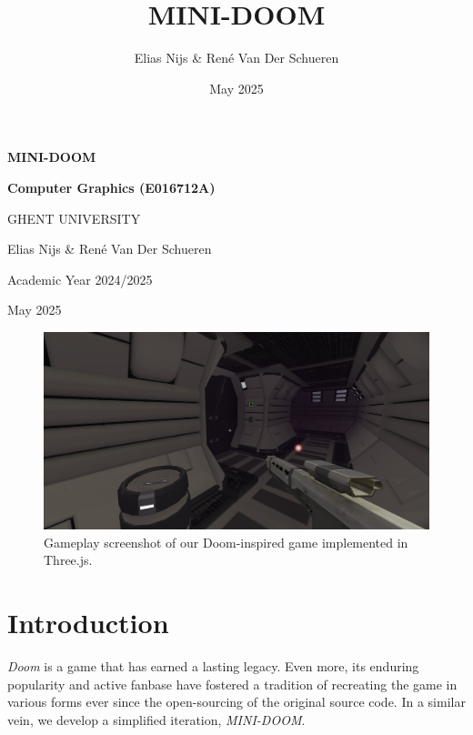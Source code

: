 \documentclass{article}
\title{MINI-DOOM}
\author{Elias Nijs \& René Van Der Schueren}
\date{May 2025}
\newcommand{\courseinfo}{Computer Graphics (E016712A)}
\newcommand{\academicyear}{Academic Year 2024/2025}
\newcommand{\university}{GHENT UNIVERSITY}
\begin{document}
\begin{titlepage}
    \centering
    \vspace*{1cm}

    \Huge
    \textbf{MINI-DOOM}\\
    \vspace{1.5cm}

    \Large
    \textbf{\courseinfo}\\
    \vspace{0.5cm}

    \large
    \university\\
    \vspace{0.5cm}

    \vspace{1.5cm}

    \Large
    Elias Nijs \& René Van Der Schueren\\
    \vspace{0.5cm}

    \large
    \academicyear\\
    \vspace{0.5cm}

    \large
    May 2025\\

\end{titlepage}

\pagebreak

\tableofcontents

\pagebreak

\begin{figure}[H]
    \centering
    \includegraphics[width=\textwidth]{diagrams/gameplay.png}
    \caption{Gameplay screenshot of our Doom-inspired game implemented in Three.js.}
    \label{fig:gameplay-main}
\end{figure}

\section{Introduction}\label{sec:introduction}
\textit{Doom} is a game that has earned a lasting legacy. Even more, its enduring popularity and
active fanbase have fostered a tradition of recreating the game in various forms ever since
the open-sourcing of the original source code. In a similar vein, we develop a simplified
iteration, \textit{MINI-DOOM}.
\end{document}
